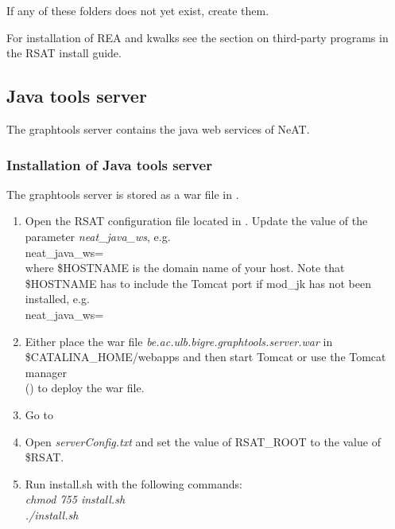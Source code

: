 \documentclass{book}
\begin{document}
If any of these folders does not yet exist, create them.

For installation of REA and kwalks see the section on third-party programs in
the RSAT install guide.

\subsection{Java tools server}

The graphtools server contains the java web services of NeAT.

\subsubsection{Installation of Java tools server}

The graphtools server is stored as a war file in .

\begin{enumerate}

\item Open the RSAT configuration file
 located in .
Update the value of the parameter \textit{neat\_java\_ws}, e.g.\\
neat\_java\_ws=\\
where \$HOSTNAME is the domain name of your host. Note that \$HOSTNAME has to
include the Tomcat port if mod\_jk has not been installed, e.g.\\
neat\_java\_ws=

\item Either place the war file \textit{be.ac.ulb.bigre.graphtools.server.war} in
\$CATALINA\_HOME/webapps and then start Tomcat or use the Tomcat manager\\
 ()
 to deploy the war file.

\item Go to 

\item Open \textit{serverConfig.txt} and set the value of RSAT\_ROOT to the value of \$RSAT.

\item Run install.sh with the following commands:\\
	  \textit{chmod 755 install.sh}\\
      \textit{./install.sh}

\end{enumerate}
\end{document}
